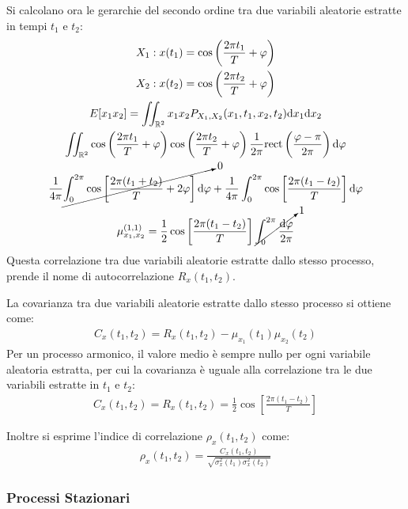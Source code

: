 \documentclass{article}
\newcommand{\rect}{\mathrm{rect}}
\newcommand{\df}{\mathrm{d}}
\numberwithin{equation}{subsection}
\begin{document}
Si calcolano ora le gerarchie del secondo ordine tra due variabili aleatorie estratte in tempi $t_1$ e $t_2$:
\begin{gather*}
    X_1:x(t_1)=\displaystyle\cos\left(\frac{2\pi t_1}{T}+\varphi\right)\\
    X_2:x(t_2)=\displaystyle\cos\left(\frac{2\pi t_2}{T}+\varphi\right)\\
    E[x_1x_2]=\displaystyle\iint_{\mathbb{R}^2}x_1x_2P_{X_1,X_2}(x_1,t_1,x_2,t_2)\df x_1\df x_2\\
    \displaystyle\iint_{\mathbb{R}^2}\cos\left(\frac{2\pi t_1}{T}+\varphi\right)\cos\left(\frac{2\pi t_2}{T}+\varphi\right)\frac{1}{2\pi}\rect\left(\frac{\varphi-\pi}{2\pi}\right)\df\varphi\\
    \displaystyle\frac{1}{4\pi}\cancelto{0}{\int_{0}^{2\pi}\cos\left[\frac{2\pi(t_1+t_2)}{T}+2\varphi\right]\df\varphi}+\frac{1}{4\pi}\int_{0}^{2\pi}\cos\left[\frac{2\pi(t_1-t_2)}{T}\right]\df\varphi\\
    \mu_{x_1,x_2}^{(1,1)}=\displaystyle\frac{1}{2}\cos\left[\frac{2\pi(t_1-t_2)}{T}\right]\cancelto{1}{\int_0^{2\pi}\frac{\df\varphi}{2\pi}}
\end{gather*}
Questa correlazione tra due variabili aleatorie estratte dallo stesso processo, prende il nome di autocorrelazione $R_{x}(t_1,t_2)$.


La covarianza tra due variabili aleatorie estratte dallo stesso processo si ottiene come:
\begin{gather}
    C_x(t_1,t_2)=R_x(t_1,t_2)-\mu_{x_1}(t_1)\mu_{x_2}(t_2)
\end{gather}
Per un processo armonico, il valore medio è sempre nullo per ogni variabile aleatoria estratta, per cui la covarianza è uguale alla correlazione tra le due variabili 
estratte in $t_1$ e $t_2$:
\begin{gather*}
    C_x(t_1,t_2)=R_x(t_1,t_2)=\displaystyle\frac{1}{2}\cos\left[\frac{2\pi(t_1-t_2)}{T}\right]
\end{gather*} 

Inoltre si esprime l'indice di correlazione $\rho_{x}(t_1,t_2)$ come:
\begin{gather}
    \rho_x(t_1,t_2)=\displaystyle\frac{C_x(t_1,t_2)}{\sqrt{\sigma_x^2(t_1)\sigma_x^2(t_2)}}
\end{gather}

\subsubsection{Processi Stazionari}
\end{document}
